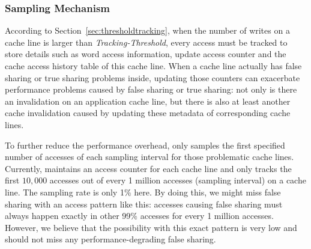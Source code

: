 \subsubsection{Sampling Mechanism}
\label{sec:sample}
According to Section~\ref{sec:thresholdtracking}, 
when the number of writes on a cache line is larger than {\it Tracking-Threshold}, 
every access must be tracked to store details such as word access information, update access counter and the
cache access history table of this cache line. 
When a cache line actually has false sharing or true sharing problems inside,
updating those counters can exacerbate performance problems caused by false sharing or true
sharing: 
not only is there an invalidation on an application cache line, 
but there is also
at least another cache invalidation caused by updating these metadata of corresponding cache lines.

To further reduce the performance overhead, \Predator{} only samples the first specified
number of accesses of each sampling interval for those problematic cache lines. 
Currently, \Predator{} maintains an access counter for each cache line 
and only tracks the first $10,000$ accesses out of  every 1 million accesses 
(sampling interval) on a cache line.
The sampling rate is only 1\% here.
By doing this, we might miss false sharing with an access pattern like this:
accesses causing false sharing must always 
happen exactly in other 99\% accesses for every 1 million accesses.
However, we believe that the possibility with this exact pattern is very low and \Predator{} 
should not miss any performance-degrading false sharing.  

